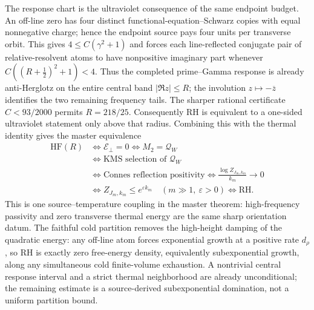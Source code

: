\documentclass[11pt]{article}
\begin{document}
The response chart is the ultraviolet consequence of the same endpoint budget.  An off-line
zero has four distinct functional-equation--Schwarz copies with equal nonnegative charge; hence
the endpoint source pays four units per transverse orbit.  This gives
$4\le C(\gamma^2+1)$ and forces each line-reflected conjugate pair of relative-resolvent atoms to
have nonpositive imaginary part whenever $C((R+\frac12)^2+1)<4$.  Thus the completed
prime--Gamma response is already anti-Herglotz on the entire central band $|\Re z|\le R$; the
involution $z\mapsto-\overline z$ identifies the two remaining frequency tails.  The sharper
rational certificate $C<93/2000$ permits $R=218/25$.  Consequently RH is equivalent to a
one-sided ultraviolet statement only above that radius.  Combining this with the thermal
identity gives the master equivalence
\[
 \begin{aligned}
 \mathrm{HF}(R)&\Longleftrightarrow\mathcal E_\perp=0
 \Longleftrightarrow M_2=\mathcal Q_W\\
 &\Longleftrightarrow\text{KMS selection of }\mathcal Q_W\\
 &\Longleftrightarrow\text{Connes reflection positivity}
 \Longleftrightarrow
 \frac{\log Z_{J_m,k_m}}{k_m}\longrightarrow0\\
 &\Longleftrightarrow
 Z_{J_m,k_m}\le e^{\varepsilon k_m}\quad(m\gg1,\ \varepsilon>0)
 \Longleftrightarrow\mathrm{RH}.
 \end{aligned}
\]
This is one source--temperature coupling in the master theorem: high-frequency passivity and zero
transverse thermal energy are the same sharp orientation datum.  The faithful cold partition
removes the high-height damping of the quadratic energy: any off-line atom forces exponential
growth at a positive rate $d_\rho$, so RH is exactly zero free-energy density, equivalently
subexponential growth, along any simultaneous cold finite-volume exhaustion.  A nontrivial central
response interval and a strict thermal neighborhood are already unconditional; the remaining
estimate is a source-derived subexponential domination, not a uniform partition bound.
\end{document}
